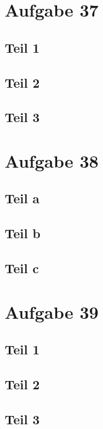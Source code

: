 \documentclass[10pt,a4paper]{article}
\begin{document}
\section{Aufgabe 37}

\subsection{Teil 1}

\subsection{Teil 2}

\subsection{Teil 3}

\section{Aufgabe 38}

\subsection{Teil a}

\subsection{Teil b}

\subsection{Teil c}

\section{Aufgabe 39}

\subsection{Teil 1}

\subsection{Teil 2}

\subsection{Teil 3}
\end{document}
